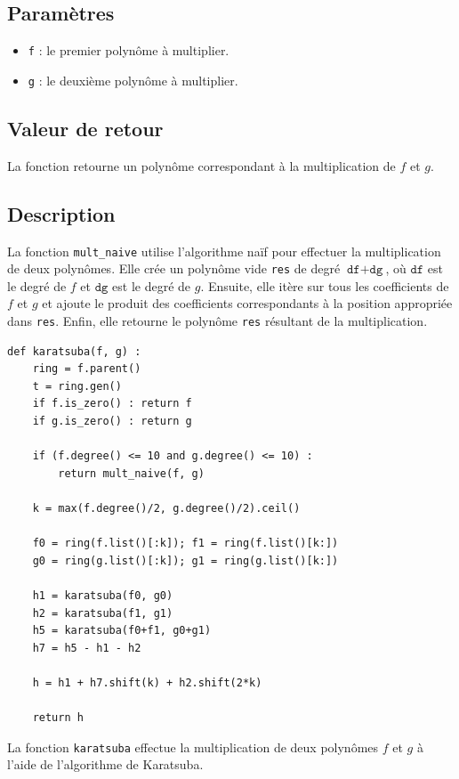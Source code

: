 \documentclass[a4paper]{article}
\begin{document}
\subsection*{Paramètres}
\begin{itemize}
  \item \texttt{f} : le premier polynôme à multiplier.
  \item \texttt{g} : le deuxième polynôme à multiplier.
\end{itemize}
\subsection*{Valeur de retour}
La fonction retourne un polynôme correspondant à la multiplication de $f$ et $g$.
\subsection*{Description}
La fonction \texttt{mult\_naive} utilise l'algorithme naïf pour effectuer la multiplication de deux polynômes. Elle crée un polynôme vide \texttt{res} de degré $\texttt{df} + \texttt{dg}$, où $\texttt{df}$ est le degré de $f$ et $\texttt{dg}$ est le degré de $g$. Ensuite, elle itère sur tous les coefficients de $f$ et $g$ et ajoute le produit des coefficients correspondants à la position appropriée dans \texttt{res}. Enfin, elle retourne le polynôme \texttt{res} résultant de la multiplication.

\begin{lstlisting}[frame=leftline, title={karastuba}]
def karatsuba(f, g) :
    ring = f.parent()
    t = ring.gen()
    if f.is_zero() : return f
    if g.is_zero() : return g
    
    if (f.degree() <= 10 and g.degree() <= 10) : 
        return mult_naive(f, g)

    k = max(f.degree()/2, g.degree()/2).ceil()

    f0 = ring(f.list()[:k]); f1 = ring(f.list()[k:])
    g0 = ring(g.list()[:k]); g1 = ring(g.list()[k:])

    h1 = karatsuba(f0, g0)
    h2 = karatsuba(f1, g1)
    h5 = karatsuba(f0+f1, g0+g1)
    h7 = h5 - h1 - h2

    h = h1 + h7.shift(k) + h2.shift(2*k)

    return h
\end{lstlisting}

La fonction \texttt{karatsuba} effectue la multiplication de deux polynômes $f$ et $g$ à l'aide de l'algorithme de Karatsuba.
\end{document}
